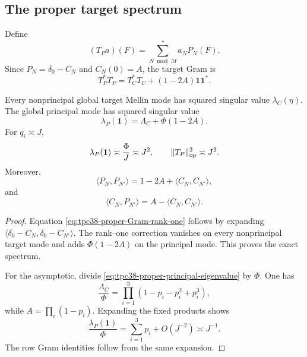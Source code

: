 \subsection{The proper target spectrum}

Define
\begin{equation}
 (T_Pa)(F)=\sum_{N\bmod M}^{*}a_NP_N(F).
 \label{eq:tpc38-TP-definition}
\end{equation}
Since \(P_N=\delta_0-C_N\) and \(C_N(0)=A\), the target Gram is
\begin{equation}
 T_P^*T_P=T_C^*T_C+(1-2A)\mathbf1\mathbf1^*.
 \label{eq:tpc38-proper-Gram-rank-one}
\end{equation}

\begin{theorem}
\label{thm:tpc38-proper-target-spectrum}
Every nonprincipal global target Mellin mode has squared singular value
\(\lambda_C(\eta)\).  The global principal mode has squared singular value
\begin{equation}
 \boxed{
 \lambda_P(\mathbf1)
 =\Lambda_C+\Phi(1-2A).}
 \label{eq:tpc38-proper-principal-eigenvalue}
\end{equation}
For \(q_i\asymp J\),
\begin{equation}
 \lambda_P(\mathbf1)\asymp\frac\Phi J\asymp J^2,
 \qquad
 \|T_P\|_{\operatorname{op}}^2\asymp J^2.
 \label{eq:tpc38-TP-endpoint}
\end{equation}
Moreover,
\begin{equation}
 \langle P_N,P_{N'}\rangle
 =1-2A+\langle C_N,C_{N'}\rangle,
 \label{eq:tpc38-proper-row-Gram}
\end{equation}
and
\begin{equation}
 \langle C_N,P_{N'}\rangle
 =A-\langle C_N,C_{N'}\rangle.
 \label{eq:tpc38-cross-row-Gram}
\end{equation}
\end{theorem}

\begin{proof}
Equation \eqref{eq:tpc38-proper-Gram-rank-one} follows by expanding
\(\langle\delta_0-C_N,\delta_0-C_{N'}\rangle\).  The rank--one correction
vanishes on every nonprincipal target mode and adds \(\Phi(1-2A)\) on the
principal mode.  This proves the exact spectrum.

For the asymptotic, divide \eqref{eq:tpc38-proper-principal-eigenvalue} by
\(\Phi\).  One has
\begin{equation}
 \frac{\Lambda_C}{\Phi}
 =\prod_{i=1}^3
 \left(1-p_i-p_i^2+p_i^3\right),
 \label{eq:tpc38-Lambda-density}
\end{equation}
while \(A=\prod_i(1-p_i)\).  Expanding the fixed products shows
\begin{equation}
 \frac{\lambda_P(\mathbf1)}\Phi
 =\sum_{i=1}^3p_i+O(J^{-2})\asymp J^{-1}.
 \label{eq:tpc38-proper-principal-density}
\end{equation}
The row Gram identities follow from the same expansion.
\end{proof}

